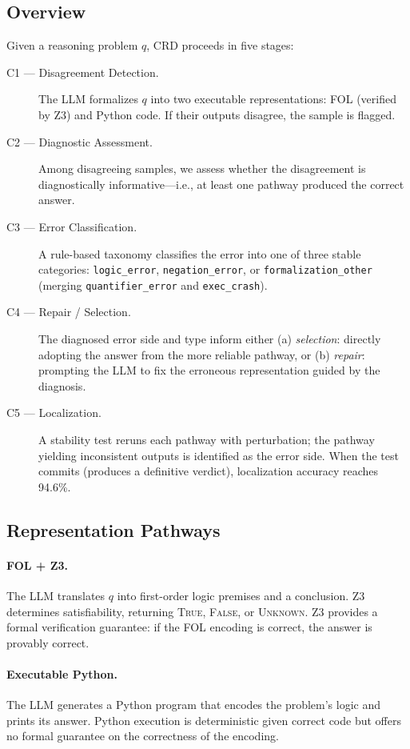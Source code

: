 \documentclass[11pt,a4paper]{article}
\newcommand{\method}{CRD}
\begin{document}
\subsection{Overview}

Given a reasoning problem $q$, \method{} proceeds in five stages:
\begin{description}
\item[C1 --- Disagreement Detection.]
The LLM formalizes $q$ into two executable representations: FOL (verified by Z3) and Python code.
If their outputs disagree, the sample is flagged.
\item[C2 --- Diagnostic Assessment.]
Among disagreeing samples, we assess whether the disagreement is diagnostically informative---i.e., at least one pathway produced the correct answer.
\item[C3 --- Error Classification.]
A rule-based taxonomy classifies the error into one of three stable categories: \texttt{logic\_error}, \texttt{negation\_error}, or \texttt{formalization\_other} (merging \texttt{quantifier\_error} and \texttt{exec\_crash}).
\item[C4 --- Repair / Selection.]
The diagnosed error side and type inform either (a) \emph{selection}: directly adopting the answer from the more reliable pathway, or (b) \emph{repair}: prompting the LLM to fix the erroneous representation guided by the diagnosis.
\item[C5 --- Localization.]
A stability test reruns each pathway with perturbation; the pathway yielding inconsistent outputs is identified as the error side.
When the test commits (produces a definitive verdict), localization accuracy reaches 94.6\%.
\end{description}

\subsection{Representation Pathways}

\paragraph{FOL + Z3.}
The LLM translates $q$ into first-order logic premises and a conclusion.
Z3 determines satisfiability, returning \textsc{True}, \textsc{False}, or \textsc{Unknown}.
Z3 provides a formal verification guarantee: if the FOL encoding is correct, the answer is provably correct.

\paragraph{Executable Python.}
The LLM generates a Python program that encodes the problem's logic and prints its answer.
Python execution is deterministic given correct code but offers no formal guarantee on the correctness of the encoding.
\end{document}
